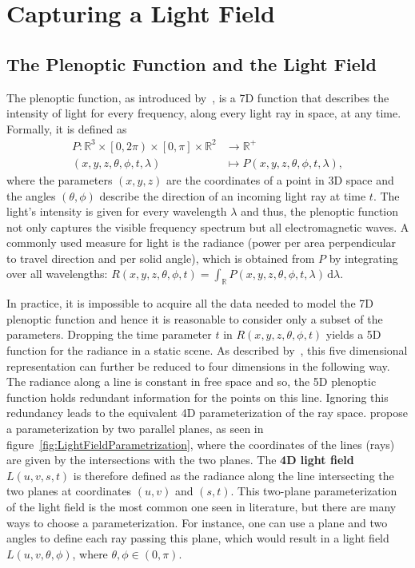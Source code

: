 \chapter{Capturing a Light Field}
\label{chp:light_field_capturing}

\section{The Plenoptic Function and the Light Field}

The plenoptic function, as introduced by~\cite{AdelsonBergen}, is a 7D function that describes the intensity of light for every frequency, along every light ray in space, at any time. 
Formally, it is defined as
\begin{align*}
	P \colon \mathbb{R}^3 \times \left[0, 2 \pi \right) \times \left[ 0, \pi \right] \times \mathbb{R}^2 & \to \mathbb{R}^+ \\
	\left(x, y, z, \theta, \phi, t, \lambda \right) & \mapsto P\left(x, y, z, \theta, \phi, t, \lambda \right), 
\end{align*}
where the parameters $\left(x, y, z\right)$ are the coordinates of a point in 3D space and the angles $\left(\theta, \phi \right)$ describe the direction of an incoming light ray at time $t$. 
The light's intensity is given for every wavelength $\lambda$ and thus, the plenoptic function not only captures the visible frequency spectrum but all electromagnetic waves. 
A commonly used measure for light is the radiance (power per area perpendicular to travel direction and per solid angle), which is obtained from $P$ by integrating over all wavelengths: 
$R\left(x, y, z, \theta, \phi, t\right) = \int_{\mathbb{R}} \! P\left(x, y, z, \theta, \phi, t, \lambda \right) \, \mathrm{d} \lambda$.

In practice, it is impossible to acquire all the data needed to model the 7D plenoptic function and hence it is reasonable to consider only a subset of the parameters. 
Dropping the time parameter $t$ in $R\left( x, y, z, \theta, \phi, t \right) $ yields a 5D function for the radiance in a static scene. 
As described by~\cite{LightFieldRendering}, this five dimensional representation can further be reduced to four dimensions in the following way. 
The radiance along a line is constant in free space and so, the 5D plenoptic function holds redundant information for the points on this line. 
Ignoring this redundancy leads to the equivalent 4D parameterization of the ray space. 
\cite{LightFieldRendering} propose a parameterization by two parallel planes, as seen in figure~\ref{fig:LightFieldParametrization}, where the coordinates of the lines (rays) are given by the intersections with the two planes.
The \textbf{4D light field} $L(u, v, s, t)$ is therefore defined as the radiance along the line intersecting the two planes at coordinates $(u, v)$ and $(s, t)$.
This two-plane parameterization of the light field is the most common one seen in literature, but there are many ways to choose a parameterization.
For instance, one can use a plane and two angles to define each ray passing this plane, which would result in a light field $L(u, v, \theta, \phi)$, where $\theta, \phi \in (0, \pi)$.

